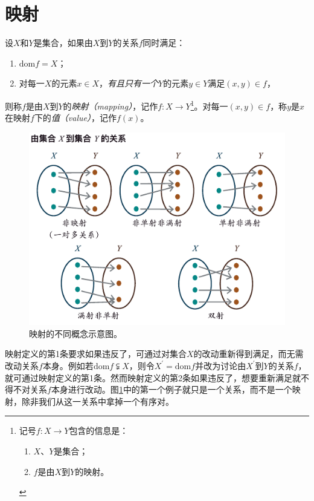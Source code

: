 \documentclass[../main.tex]{subfiles}
\begin{document}
\section{映射}
\begin{definition}[映射]\label{def:II.1.3}
    设$X$和$Y$是集合，如果由$X$到$Y$的关系$f$同时满足：
    \begin{enumerate}
        \item $\mathrm{dom}f=X$；
        \item 对每一$X$的元素$x\in X$，\emph{有且只有一个}$Y$的元素$y\in Y$满足$\left(x,y\right)\in f$，
    \end{enumerate}
    则称$f$是由$X$到$Y$的\emph{映射（mapping）}，记作$f:X\rightarrow Y$\footnote{记号$f:X\rightarrow Y$包含的信息是：
        \begin{enumerate}
            \item $X$、$Y$是集合；
            \item $f$是由$X$到$Y$的映射。
        \end{enumerate}
    }。对每一$\left(x,y\right)\in f$，称$y$是$x$在映射$f$下的\emph{值（value）}，记作$f\left(x\right)$。
\end{definition}

\begin{figure}[htbp]
    \centering
    \includegraphics{../images/mapping.pdf}
    \caption{映射的不同概念示意图。}
    \label{fig:II.1.3}
\end{figure}

映射定义的第1条要求如果违反了，可通过对集合$X$的改动重新得到满足，而无需改动关系$f$本身。例如若$\mathrm{dom}f\subsetneqq X$，则令$X^\prime=\mathrm{dom}f$并改为讨论由$X^\prime$到$Y$的关系$f$，就可通过映射定义的第1条。然而映射定义的第2条如果违反了，想要重新满足就不得不对关系$f$本身进行改动。图\ref{fig:II.1.3}中的第一个例子就只是一个关系，而不是一个映射，除非我们从这一关系中拿掉一个有序对。
\end{document}
